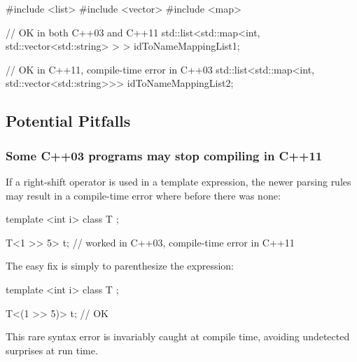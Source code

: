 \begin{emcppshiddenlisting}[emcppsbatch=e3]
#include <list>
#include <vector>
#include <map>
\end{emcppshiddenlisting}
\begin{emcppslisting}[emcppsbatch=e3]
// OK in both C++03 and C++11
std::list<std::map<int, std::vector<std::string> > > idToNameMappingList1;

// OK in C++11, compile-time error in C++03
std::list<std::map<int, std::vector<std::string>>>   idToNameMappingList2;
\end{emcppslisting}


\subsection[Potential Pitfalls]{Potential Pitfalls}\label{potential-pitfalls}

\subsubsection[Some C++03 programs may stop compiling in C++11]{Some C++03 programs may stop compiling in C++11}\label{some-c++03-programs-may-stop-working-in-c++11}

If a right-shift operator is used in a template expression, the newer
parsing rules may result in a compile-time error where before there was
none:

\begin{emcppshiddenlisting}[emcppsbatch=ped1,emcppsstandards=c++03]
template <int i> class T {};
\end{emcppshiddenlisting}
\begin{emcppslisting}[emcppsbatch=ped1]
T<1 >> 5> t;  // worked in C++03, compile-time error in C++11
\end{emcppslisting}

\noindent The easy fix is simply to parenthesize the expression:

\begin{emcppshiddenlisting}[emcppsbatch=ped2,emcppsstandards={c++11,c++14}]
template <int i> class T {};
\end{emcppshiddenlisting}
\begin{emcppslisting}[emcppsbatch=ped2]
T<(1 >> 5)> t;  // OK
\end{emcppslisting}

\noindent This rare syntax error is invariably caught at compile time, avoiding undetected surprises at run time.

